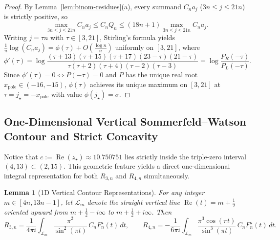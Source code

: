 \documentclass[11pt,reqno]{amsart}
\newtheorem{lemma}[theorem]{Lemma}
\theoremstyle{definition}
\theoremstyle{remark}
\begin{document}
\begin{proof}
By Lemma~\ref{lem:binom-residues}(a), every summand $C_n a_j$ ($3n \le j \le 21n$) is strictly positive, so
\[
  \max_{3n \le j \le 21n} C_n a_j \le C_n Q_n \le (18n + 1) \max_{3n \le j \le 21n} C_n a_j.
\]
Writing $j = \tau n$ with $\tau \in [3, 21]$, Stirling's formula yields $\frac{1}{n}\log(C_n a_j) = \phi(\tau) + O(\frac{\log n}{n})$ uniformly on $[3, 21]$, where
\[
  \phi'(\tau) = \log\frac{(\tau+13)(\tau+15)(\tau+17)(23-\tau)(21-\tau)}{\tau(\tau+2)(\tau+4)(\tau-2)(\tau-3)}
              = \log\frac{P_R(-\tau)}{P_L(-\tau)}.
\]
Since $\phi'(\tau) = 0 \iff P(-\tau) = 0$ and $P$ has the unique real root $x_{\mathrm{pole}} \in (-16, -15)$, $\phi(\tau)$ achieves its unique maximum on $[3, 21]$ at $\tau = j_\star = -x_{\mathrm{pole}}$ with value $\phi(j_\star) = \sigma$.
\end{proof}

\subsection{One-Dimensional Vertical Sommerfeld--Watson Contour and Strict Concavity}
Notice that $c := \operatorname{Re}(z_\star) \approx 10.750751$ lies strictly inside the triple-zero interval $(4, 13) \subset (2, 15)$. This geometric feature yields a direct one-dimensional integral representation for both $R_{3,n}$ and $R_{4,n}$ simultaneously.

\begin{lemma}[1D Vertical Contour Representations]
\label{lem:contour}
For any integer $m \in [4n, 13n - 1]$, let $\mathcal{L}_{m}$ denote the straight vertical line $\operatorname{Re}(t) = m + \frac{1}{2}$ oriented upward from $m + \frac{1}{2} - i\infty$ to $m + \frac{1}{2} + i\infty$. Then
\begin{equation}
\label{eq:R3-R4-contour}
  R_{3,n} = \frac{1}{4\pi i} \int_{\mathcal{L}_m} \frac{\pi^2}{\sin^2(\pi t)}\, C_n F_n^{\star}(t)\, dt,
  \qquad
  R_{4,n} = -\frac{1}{6\pi i} \int_{\mathcal{L}_m} \frac{\pi^3 \cos(\pi t)}{\sin^3(\pi t)}\, C_n F_n^{\star}(t)\, dt.
\end{equation}
\end{lemma}
\end{document}
